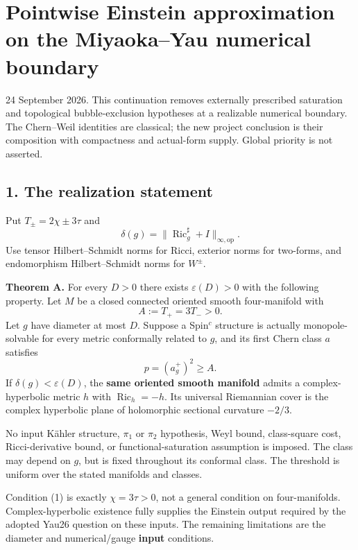 \documentclass[
  11pt,
]{article}
\author{}
\date{}
\begin{document}
\hypertarget{pointwise-einstein-approximation-on-the-miyaokayau-numerical-boundary}{%
\section{Pointwise Einstein approximation on the Miyaoka--Yau numerical
boundary}\label{pointwise-einstein-approximation-on-the-miyaokayau-numerical-boundary}}

24 September 2026. This continuation removes externally prescribed
saturation and topological bubble-exclusion hypotheses at a realizable
numerical boundary. The Chern--Weil identities are classical; the new
project conclusion is their composition with compactness and actual-form
supply. Global priority is not asserted.

\hypertarget{the-realization-statement}{%
\subsection{1. The realization
statement}\label{the-realization-statement}}

Put \(T_\pm=2\chi\pm3\tau\) and \[
 \delta(g)=\|\operatorname{Ric}_g^\sharp+I\|_{\infty,\mathrm{op}}.
\] Use tensor Hilbert--Schmidt norms for Ricci, exterior norms for
two-forms, and endomorphism Hilbert--Schmidt norms for \(W^\pm\).

\textbf{Theorem A.} For every \(D>0\) there exists \(\varepsilon(D)>0\)
with the following property. Let \(M\) be a closed connected oriented
smooth four-manifold with \[
 A:=T_+=3T_->0.                                           \tag{1}
\] Let \(g\) have diameter at most \(D\). Suppose a Spin\(^c\) structure
is actually monopole-solvable for every metric conformally related to
\(g\), and its first Chern class \(a\) satisfies \[
                          p=(a_g^+)^2\ge A.               \tag{2}
\] If \(\delta(g)<\varepsilon(D)\), the \textbf{same oriented smooth
manifold} admits a complex-hyperbolic metric \(h\) with
\(\operatorname{Ric}_h=-h\). Its universal Riemannian cover is the
complex hyperbolic plane of holomorphic sectional curvature \(-2/3\).

No input Kähler structure, \(\pi_1\) or \(\pi_2\) hypothesis, Weyl
bound, class-square cost, Ricci-derivative bound, or
functional-saturation assumption is imposed. The class may depend on
\(g\), but is fixed throughout its conformal class. The threshold is
uniform over the stated manifolds and classes.

Condition (1) is exactly \(\chi=3\tau>0\), not a general condition on
four-manifolds. Complex-hyperbolic existence fully supplies the Einstein
output required by the adopted Yau26 question on these inputs. The
remaining limitations are the diameter and numerical/gauge
\textbf{input} conditions.
\end{document}
